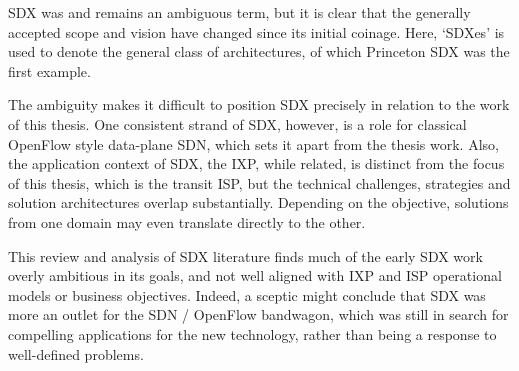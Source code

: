 
    



\smallskip

SDX was and remains an ambiguous term, but it is clear that the generally accepted scope and vision have changed since its initial coinage.
Here, `SDXes' is used to denote the general class of architectures, of which Princeton SDX was the first example.


The ambiguity makes it difficult to position SDX precisely in relation to the work of this thesis.
One consistent strand of SDX, however, is a role for classical OpenFlow style data-plane SDN, which sets it apart from the thesis work.
Also, the application context of SDX, the IXP, while related, is distinct from the focus of this thesis, which is the transit ISP, but the technical challenges, strategies and solution architectures overlap substantially.
Depending on the objective, solutions from one domain may even translate directly to the other.


This review and analysis of SDX literature finds much of the early SDX work overly ambitious in its goals, and not well aligned with IXP and ISP operational models or business objectives.   Indeed, a sceptic might conclude that SDX was more an outlet for the SDN / OpenFlow bandwagon, which was still in search for compelling applications for the new technology, rather than being a response to well-defined problems.


